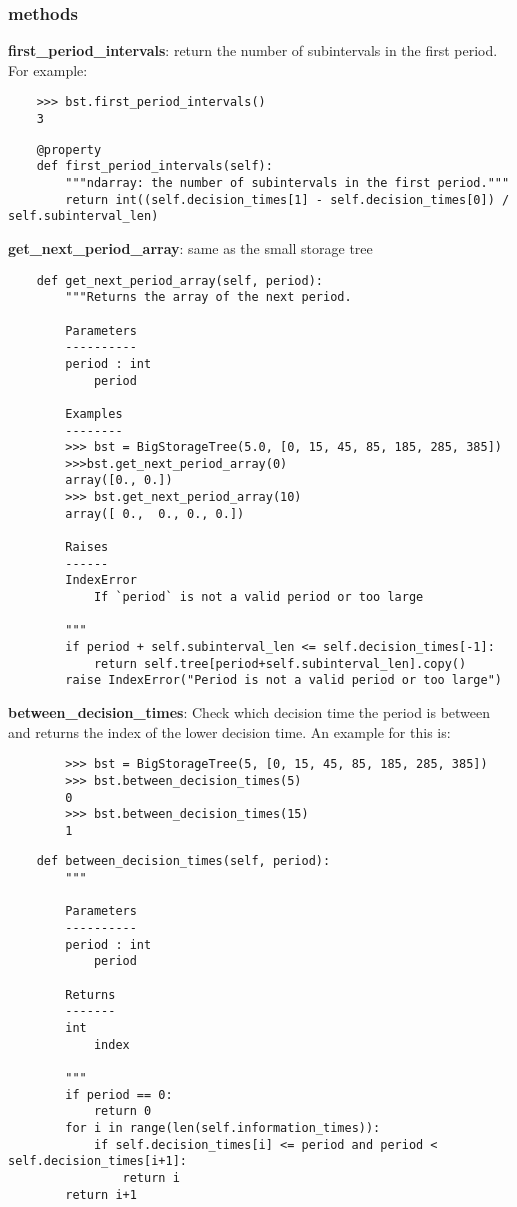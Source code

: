 \documentclass[12pt]{article}
\begin{document}
\subsubsection{methods}
\textbf{first\_period\_intervals}: return the number of subintervals in the first period. For example:
\begin{verbatim}
    >>> bst.first_period_intervals()
    3
\end{verbatim}
\begin{verbatim}
	@property
	def first_period_intervals(self):
		"""ndarray: the number of subintervals in the first period."""
		return int((self.decision_times[1] - self.decision_times[0]) / self.subinterval_len)
\end{verbatim}
\textbf{get\_next\_period\_array}: same as the small storage tree
\begin{verbatim}
	def get_next_period_array(self, period):
		"""Returns the array of the next period.

		Parameters
		----------
		period : int
			period

		Examples
		--------
		>>> bst = BigStorageTree(5.0, [0, 15, 45, 85, 185, 285, 385])
		>>>bst.get_next_period_array(0)
		array([0., 0.])
		>>> bst.get_next_period_array(10)
		array([ 0.,  0., 0., 0.])

		Raises
		------
		IndexError
			If `period` is not a valid period or too large

		"""
		if period + self.subinterval_len <= self.decision_times[-1]:
			return self.tree[period+self.subinterval_len].copy()
		raise IndexError("Period is not a valid period or too large")
\end{verbatim}
\textbf{between\_decision\_times}: Check which decision time the period is between and returns
		the index of the lower decision time. An example for this is:
\begin{verbatim}
		>>> bst = BigStorageTree(5, [0, 15, 45, 85, 185, 285, 385])
		>>> bst.between_decision_times(5)
		0
		>>> bst.between_decision_times(15)
		1
\end{verbatim}
\begin{verbatim}
	def between_decision_times(self, period):
		"""

		Parameters
		----------
		period : int
			period

		Returns
		-------
		int
			index

		"""
		if period == 0:
			return 0
		for i in range(len(self.information_times)):
			if self.decision_times[i] <= period and period < self.decision_times[i+1]:
				return i
		return i+1
\end{verbatim}
\end{document}
